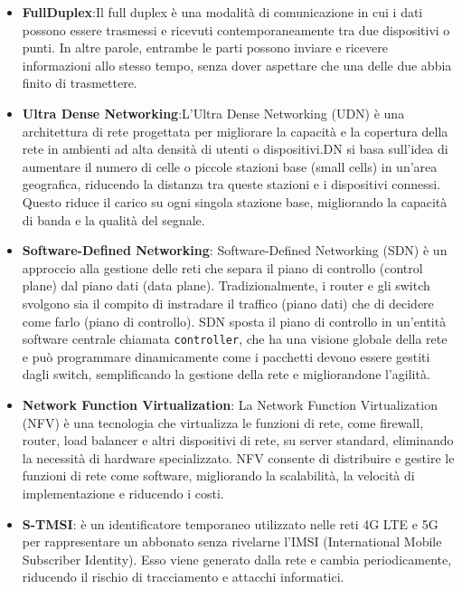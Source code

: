\documentclass[english]{article}
\begin{document}
\begin{itemize}
	\item \textbf{FullDuplex}\hypertarget{FullDuplex}{}:Il full duplex è una modalità di comunicazione
	      in cui i dati possono essere trasmessi e ricevuti contemporaneamente tra due dispositivi
	      o punti. In altre parole, entrambe le parti possono inviare e ricevere informazioni allo
	      stesso tempo, senza dover aspettare che una delle due abbia finito di trasmettere.

	\item \textbf{Ultra Dense Networking}\hypertarget{UDN}{}:L'Ultra Dense Networking (UDN) è una
	      architettura di rete progettata per migliorare la capacità e la copertura della rete
	      in ambienti ad alta densità di utenti o dispositivi.DN si basa sull'idea di aumentare
	      il numero di celle o piccole stazioni base (small cells) in un'area geografica,
	      riducendo la distanza tra queste stazioni e i dispositivi connessi. Questo riduce il
	      carico su ogni singola stazione base, migliorando la capacità di banda e la qualità
	      del segnale.

	\item \textbf{\hypertarget{SDN}{Software-Defined Networking}}: Software-Defined Networking (SDN)
	      è un approccio alla gestione delle reti che separa il piano di controllo (control plane)
	      dal piano dati (data plane). Tradizionalmente, i router e gli switch svolgono sia il
	      compito di instradare il traffico (piano dati) che di decidere come farlo
	      (piano di controllo). SDN sposta il piano di controllo in un'entità software centrale
	      chiamata \texttt{controller}, che ha una visione globale della rete e può programmare
	      dinamicamente come i pacchetti devono essere gestiti dagli switch, semplificando la
	      gestione della rete e migliorandone l'agilità.

	\item \textbf{\hypertarget{NFV}{Network Function Virtualization}}: La Network Function
	      Virtualization (NFV) è una tecnologia che virtualizza le funzioni di rete, come firewall,
	      router, load balancer e altri dispositivi di rete, su server standard,
	      eliminando la necessità di hardware specializzato. NFV consente di distribuire e gestire
	      le funzioni di rete come software, migliorando la scalabilità, la velocità di
	      implementazione e riducendo i costi.

	\item \textbf{\hypertarget{S-TMSI}{S-TMSI}}: è un identificatore temporaneo
	      utilizzato nelle reti 4G LTE e 5G per rappresentare un abbonato senza rivelarne
	      l'IMSI (International Mobile Subscriber Identity).
	      Esso viene generato dalla rete e cambia periodicamente,
	      riducendo il rischio di tracciamento e attacchi informatici.


\end{itemize}
\end{document}
